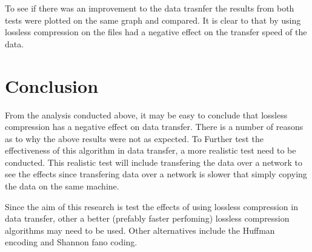 \documentclass[12pt]{article}
\begin{document}
	\begin{flushleft}
		To see if there was an improvement to the data trasnfer the results from both tests were plotted on the same graph and compared. It is clear to that by using lossless compression on the files had a negative effect on the transfer speed of the data.
	\end{flushleft}
	
	\section{Conclusion}
	\begin{flushleft}
		From the analysis conducted above, it may be easy to conclude that lossless compression has a negative effect on data transfer. There is a number of reasons as to why the above results were not as expected. To Further test the effectiveness of this algorithm in data transfer, a more realistic test need to be conducted. This realistic test will include transfering the data over a network to see the effects since transfering data over a network is slower that simply copying the data on the same machine.
		
		Since the aim of this research is test the effects of using lossless compression in data transfer, other a better (prefably faster perfoming) lossless compression algorithms may need to be used. Other alternatives include the Huffman encoding and Shannon fano coding.
	\end{flushleft}
	
\end{document}
